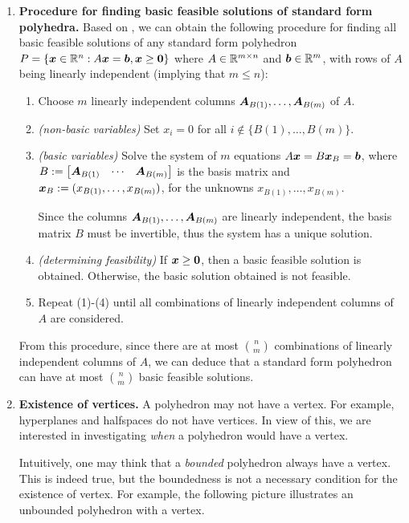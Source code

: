 \begin{enumerate}
\item \label{it:std-form-bfs-procedure} \textbf{Procedure for finding
basic feasible solutions of standard form polyhedra.} Based on
, we can obtain the following procedure
for finding all basic feasible solutions of any standard form polyhedron
\(P=\{\bm{x}\in\mathbb{R}^n:A\bm{x}=\bm{b},\bm{x}\ge\bm{0}\}\) where
\(A\in\mathbb{R}^{m\times n}\) and \(\bm{b}\in\mathbb{R}^{m}\), with rows of \(A\) being
linearly independent (implying that \(m\le n\)):
\begin{enumerate}[label={(\arabic*)}]
\item Choose \(m\) linearly independent columns \(\bm{A}_{B(1)},\dotsc,\bm{A}_{B(m)}\) of \(A\).
\item \emph{(non-basic variables)} Set \(x_i=0\) for all \(i\notin\{B(1),\dotsc,B(m)\}\).
\item \emph{(basic variables)} Solve the system of \(m\) equations
\(A\bm{x}=B\bm{x}_{B}=\bm{b}\), where
\(B:=\begin{bmatrix}\bm{A}_{B(1)}&\cdots&\bm{A}_{B(m)}\end{bmatrix} \) is
the basis matrix and \(\bm{x}_{B}:=(x_{B(1)},\dotsc,x_{B(m)})\), for the unknowns
\(x_{B(1)},\dotsc,x_{B(m)}\). \begin{note}
Since the columns \(\bm{A}_{B(1)},\dotsc,\bm{A}_{B(m)}\) are linearly
independent, the basis matrix \(B\) must be invertible, thus the system has a
unique solution.
\end{note}
\item \emph{(determining feasibility)} If \(\bm{x}\ge\bm{0}\), then a basic
feasible solution is obtained. Otherwise, the basic solution obtained is not
feasible.
\item Repeat (1)-(4) until all combinations of linearly independent columns of
\(A\) are considered.
\end{enumerate}
From this procedure, since there are at most \(\binom{n}{m}\) combinations of
linearly independent columns of \(A\), we can deduce that a standard form
polyhedron can have at most \(\binom{n}{m}\) basic feasible solutions.

\item \textbf{Existence of vertices.} A polyhedron may not have a vertex. For
example, hyperplanes and halfspaces do not have vertices. In view of this, we
are interested in investigating \emph{when} a polyhedron would have a vertex.

Intuitively, one may think that a \emph{bounded} polyhedron always have a
vertex. This is indeed true, but the boundedness is not a necessary condition
for the existence of vertex. For example, the following picture illustrates an
unbounded polyhedron with a vertex.
\begin{center}
\end{center}


\end{enumerate}
